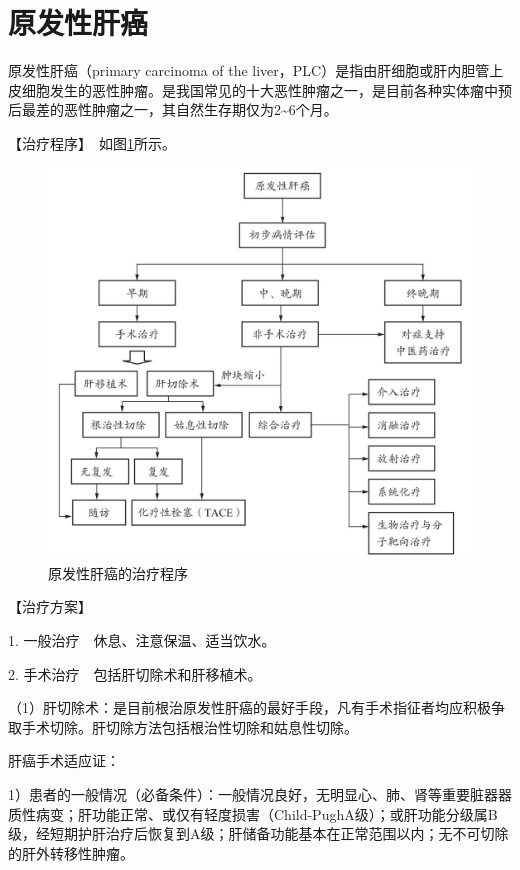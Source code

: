 \section{原发性肝癌}

原发性肝癌（primary carcinoma of the
liver，PLC）是指由肝细胞或肝内胆管上皮细胞发生的恶性肿瘤。是我国常见的十大恶性肿瘤之一，是目前各种实体瘤中预后最差的恶性肿瘤之一，其自然生存期仅为2\textasciitilde{}6个月。

【治疗程序】　如图\ref{fig3-16-1}所示。

\begin{figure}[!htbp]
 \centering
 \includegraphics{./images/Image00105.jpg}
 \captionsetup{justification=centering}
 \caption{原发性肝癌的治疗程序}
 \label{fig3-16-1}
  \end{figure} 

【治疗方案】

1. 一般治疗　休息、注意保温、适当饮水。

2. 手术治疗　包括肝切除术和肝移植术。

（1）肝切除术：是目前根治原发性肝癌的最好手段，凡有手术指征者均应积极争取手术切除。肝切除方法包括根治性切除和姑息性切除。

肝癌手术适应证：

1）患者的一般情况（必备条件）：一般情况良好，无明显心、肺、肾等重要脏器器质性病变；肝功能正常、或仅有轻度损害（Child-PughA级）；或肝功能分级属B级，经短期护肝治疗后恢复到A级；肝储备功能基本在正常范围以内；无不可切除的肝外转移性肿瘤。

